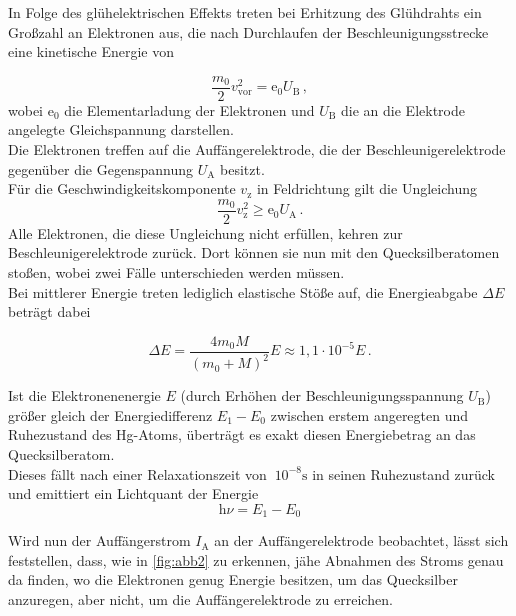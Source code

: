 In Folge des glühelektrischen Effekts treten bei Erhitzung des Glühdrahts
ein Großzahl an Elektronen aus, die nach Durchlaufen der Beschleunigungsstrecke
eine kinetische Energie von

\begin{equation*}
    \dfrac{m_0}{2} v^2_\text{vor} = \text{e}_0 U_\text{B} \,,
\end{equation*}
wobei $\text{e}_0$ die Elementarladung der Elektronen und $U_\text{B}$
die an die Elektrode angelegte Gleichspannung darstellen. \\

Die Elektronen treffen auf die Auffängerelektrode, die der Beschleunigerelektrode gegenüber
die Gegenspannung $U_\text{A}$ besitzt. \\

Für die Geschwindigkeitskomponente $v_\text{z}$ in Feldrichtung gilt die Ungleichung
\begin{equation*}
    \dfrac{m_0}{2} v^2_\text{z} \geq \text{e}_0 U_\text{A} \,.
\end{equation*}
Alle Elektronen, die diese Ungleichung nicht erfüllen, kehren zur Beschleunigerelektrode zurück.
Dort können sie nun mit den Quecksilberatomen stoßen, wobei zwei Fälle unterschieden werden müssen. \\

Bei mittlerer Energie treten lediglich elastische Stöße auf, die
Energieabgabe $\Delta E$ beträgt dabei

\begin{equation*}
    \Delta E = \frac{4 m_0 M}{(m_0 + M)^2} E \approx 1,1 \cdot 10^{-5} E \,.
\end{equation*}

Ist die Elektronenenergie $E$ (durch Erhöhen der Beschleunigungsspannung $U_\text{B}$)
größer gleich der Energiedifferenz $E_1 - E_0$ zwischen erstem angeregten und Ruhezustand
des Hg-Atoms, überträgt es exakt diesen Energiebetrag an das Quecksilberatom. \\

Dieses fällt nach einer Relaxationszeit von $~10^{-8} \unit{\second}$
in seinen Ruhezustand zurück und emittiert ein Lichtquant der Energie
\begin{equation*}
    \text{h} \nu = E_1 - E_0
\end{equation*}

Wird nun der Auffängerstrom $I_\text{A}$ an der Auffängerelektrode
beobachtet, lässt sich feststellen, dass, wie in \autoref{fig:abb2} zu erkennen,
jähe Abnahmen des Stroms genau da finden, wo die Elektronen genug Energie besitzen,
um das Quecksilber anzuregen, aber nicht, um die Auffängerelektrode zu erreichen. \\


